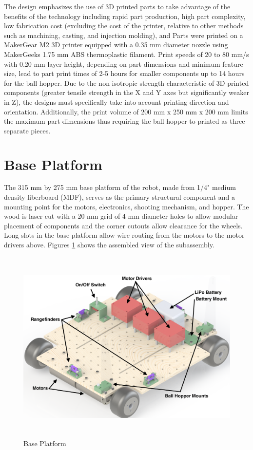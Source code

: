 The design emphasizes the use of 3D printed parts to take advantage of the benefits of the technology including rapid part production, high part complexity, low fabrication cost (excluding the cost of the printer, relative to other methods such as machining, casting, and injection molding), and Parts were printed on a MakerGear M2 3D printer equipped with a 0.35 mm diameter nozzle using MakerGeeks 1.75 mm ABS thermoplastic filament. Print speeds of 20 to 80 mm/s with 0.20 mm layer height, depending on part dimensions and minimum feature size, lead to part print times of 2-5 hours for smaller components up to 14 hours for the ball hopper. Due to the non-isotropic strength characteristic of 3D printed components (greater tensile strength in the X and Y axes but significantly weaker in Z), the designs must specifically take into account printing direction and orientation. Additionally, the print volume of 200 mm x 250 mm x 200 mm limits the maximum part dimensions thus requiring the ball hopper to printed as three separate pieces. 

\section{Base Platform}
The 315 mm by 275 mm base platform of the robot, made from 1/4" medium density fiberboard (MDF), serves as the primary structural component and a mounting point for the motors, electronics, shooting mechanism, and hopper. The wood is laser cut with a 20 mm grid of 4 mm diameter holes to allow modular placement of components and the corner cutouts allow clearance for the wheels. Long slots in the base platform allow wire routing from the motors to the motor drivers above. Figures \ref{fig:base_platform} shows the assembled view of the subassembly.

\begin{figure}[H]   %
	\centering \includegraphics[width=6in, height=3.85in, keepaspectratio]{figures/base_platform.png}
	\caption{Base Platform}	\label{fig:base_platform}
\end{figure}

